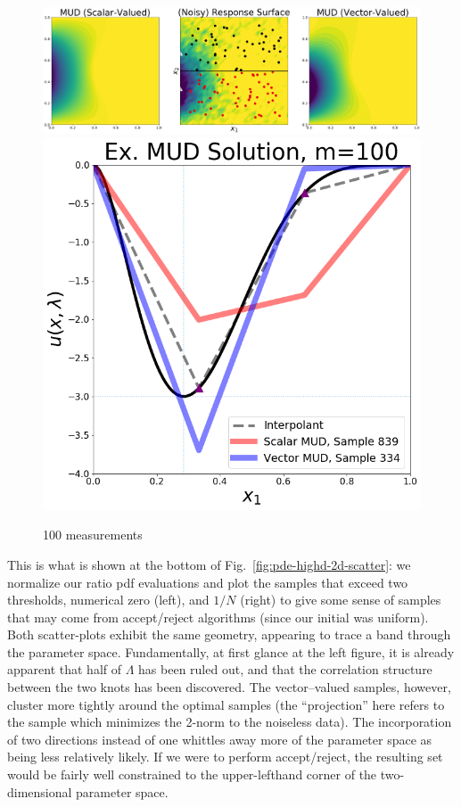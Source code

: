 \begin{figure}[htbp]
\centering
  \includegraphics[width=0.95\linewidth]{figures/pde-highd/pde-highd_surf_exmud_D2_m100.png}
  \includegraphics[width=0.6\linewidth]{figures/pde-highd/pde-highd_comp_exmud_D2_m100.png}
\caption{
100 measurements
}
\label{fig:pde-highd-2d-example}
\end{figure}


This is what is shown at the bottom of Fig.~\ref{fig:pde-highd-2d-scatter}: we normalize our ratio pdf evaluations and plot the samples that exceed two thresholds, numerical zero (left), and $1/N$ (right) to give some sense of samples that may come from accept/reject algorithms (since our initial was uniform).
Both scatter-plots exhibit the same geometry, appearing to trace a band through the parameter space.
Fundamentally, at first glance at the left figure, it is already apparent that half of $\Lambda$ has been ruled out, and that the correlation structure between the two knots has been discovered.
The vector--valued samples, however, cluster more tightly around the optimal samples (the ``projection'' here refers to the sample which minimizes the 2-norm to the noiseless data).
The incorporation of two directions instead of one whittles away more of the parameter space as being less relatively likely.
If we were to perform accept/reject, the resulting set would be fairly well constrained to the upper-lefthand corner of the two-dimensional parameter space.

